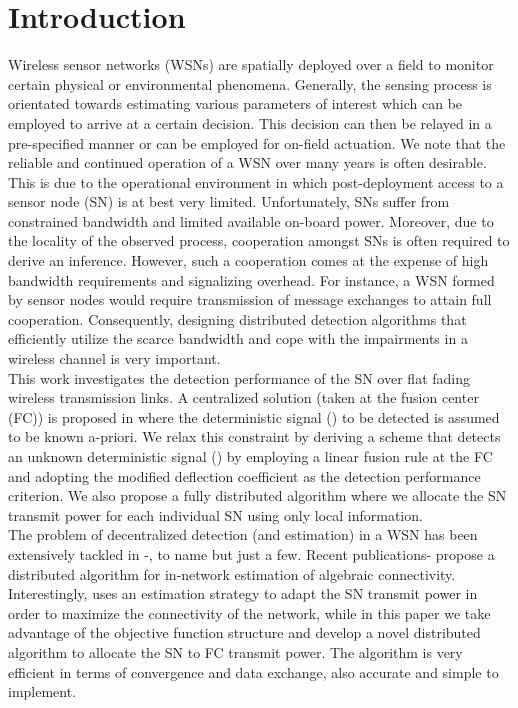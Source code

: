 \documentclass[conference]{IEEEtran}
\begin{document}
\section{Introduction}
\label{sec:intro}
Wireless sensor networks (WSNs) are spatially deployed over a field to monitor certain physical or environmental phenomena. Generally, the sensing process is orientated towards estimating various parameters of interest which can be employed to arrive at a certain decision. This decision can then be relayed in a pre-specified manner or can be employed for on-field actuation. We note that the reliable and continued operation of a WSN over many years is often desirable. This is due to the operational environment in which post-deployment access to a sensor node (SN) is at best very limited. Unfortunately, SNs suffer from constrained bandwidth and limited available on-board power. Moreover, due to the locality of the observed process, cooperation amongst SNs is often required to derive an inference. However, such a cooperation comes at the expense of high bandwidth requirements and signalizing overhead. For instance, a WSN formed by  sensor nodes would require transmission of  message  exchanges to attain full cooperation. Consequently, designing distributed detection algorithms that efficiently utilize the scarce bandwidth and cope with the impairments in a wireless channel is very important. \\
\indent This work investigates the detection performance of the SN over flat fading wireless transmission links. A centralized solution (taken at the fusion center (FC)) is proposed in \cite{les82} where the deterministic signal () to be detected is assumed to be known a-priori. We relax this constraint by deriving a scheme that detects an unknown deterministic signal () by employing a linear fusion rule at the FC and adopting the modified deflection coefficient as the detection performance criterion. We also propose a fully distributed algorithm where we allocate the SN transmit power for each individual SN using only local information.   \\
\indent The problem of decentralized detection (and estimation) in a WSN has been extensively tackled in \cite{les82}-\hspace{-0.005cm}\cite{les94}, to name but just a few. Recent publications\cite{Bertrand}-\hspace{-0.005cm}\cite{Lorenzo} propose a distributed algorithm for in-network estimation of algebraic connectivity. Interestingly, \cite{Lorenzo} uses an estimation strategy to adapt the SN transmit power in order to maximize the connectivity of the network, while in this paper we take advantage of the objective function structure and develop a novel distributed algorithm to allocate the SN to FC transmit power. The algorithm is very efficient in terms of convergence and data exchange, also accurate and simple to implement.\\
\end{document}
